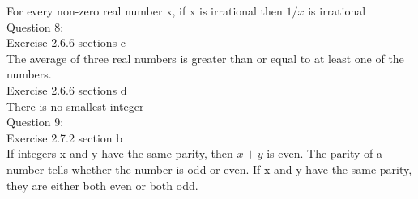 \documentclass[11pt]{article}
\begin{document}
For every non-zero real number x, if x is irrational then $1/x$ is irrational\\

\noindent Question 8: \\


Exercise 2.6.6 sections c\\

The average of three real numbers is greater than or equal to at least one of the numbers.\\

Exercise 2.6.6 sections d\\

There is no smallest integer\\

\noindent Question 9:\\
Exercise 2.7.2 section b\\

If integers x and y have the same parity, then $x + y$ is even. The parity of a number tells whether the number is odd or even. If x and y have the same parity, they are either both even or both odd.\\
\end{document}

